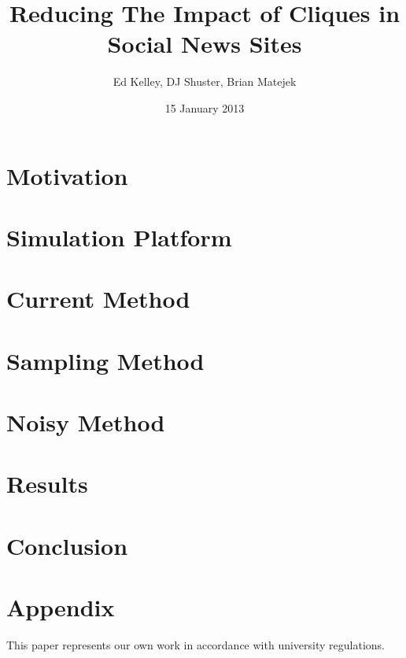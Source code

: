 \documentclass[12pt, oneside]{amsart}
\title{Reducing The Impact of Cliques in Social News Sites}
\author{Ed Kelley, DJ Shuster, Brian Matejek}
\date{15 January 2013}         %
\begin{document}
\begin{center}
\end{center}
\maketitle

\section{Motivation}

\section{Simulation Platform}


\section{Current Method}

\section{Sampling Method}

\section{Noisy Method}

\section{Results}

\section{Conclusion}

\section{Appendix}



\newpage
\nocite{*}
{}


\vfill
This paper represents our own work in accordance with university regulations.
\end{document}
